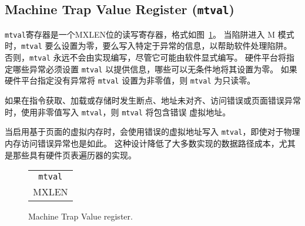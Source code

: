 \FloatBarrier
\subsection{Machine Trap Value Register ({\tt mtval})}

\iffalse
The {\tt mtval} register is an MXLEN-bit read-write register formatted as shown
in Figure~\ref{mtvalreg}.  When a trap is taken into M-mode, {\tt mtval} is
either set to zero or written with exception-specific information to assist
software in handling the trap.  Otherwise, {\tt mtval} is never written by the
implementation, though it may be explicitly written by software.  The hardware
platform will specify which exceptions must set {\tt mtval} informatively and
which may unconditionally set it to zero.
If the hardware platform specifies that no exceptions set {\tt mtval} to a
nonzero value, then {\tt mtval} is read-only zero.

If {\tt mtval} is written with a nonzero value when a breakpoint,
address-misaligned, access-fault, or page-fault exception occurs on an
instruction fetch, load, or store, then {\tt mtval} will contain the faulting
virtual address.
\fi
{\tt mtval}寄存器是一个MXLEN位的读写寄存器，格式如图~\ref{mtvalreg}。 当陷阱进入 M 模式时，{\tt mtval} 要么设置为零，要么写入特定于异常的信息，以帮助软件处理陷阱。 否则，{\tt mtval} 永远不会由实现编写，尽管它可能由软件显式编写。 硬件平台将指定哪些异常必须设置 {\tt mtval} 以提供信息，哪些可以无条件地将其设置为零。 如果硬件平台指定没有异常将 {\tt mtval} 设置为非零值，则 {\tt mtval} 为只读零。

如果在指令获取、加载或存储时发生断点、地址未对齐、访问错误或页面错误异常时，使用非零值写入 {\tt mtval}，则 {\tt mtval} 将包含错误 虚拟地址。

\iffalse
\begin{commentary}
  When page-based virtual memory is enabled, {\tt mtval} is written with
  the faulting virtual address, even for physical-memory access-fault exceptions.
  This design reduces datapath cost for most implementations, particularly
  those with hardware page-table walkers.
\end{commentary}
\fi

\begin{commentary}
当启用基于页面的虚拟内存时，会使用错误的虚拟地址写入 {\tt mtval}，即使对于物理内存访问错误异常也是如此。 这种设计降低了大多数实现的数据路径成本，尤其是那些具有硬件页表遍历器的实现。
\end{commentary}

\begin{figure}[h!]
{\footnotesize
\begin{center}
\begin{tabular}{@{}J}
 \\
\hline
{} \\
\hline
MXLEN \\
\end{tabular}
\end{center}
}
\vspace{-0.1in}
\caption{Machine Trap Value register.}
\label{mtvalreg}
\end{figure}

